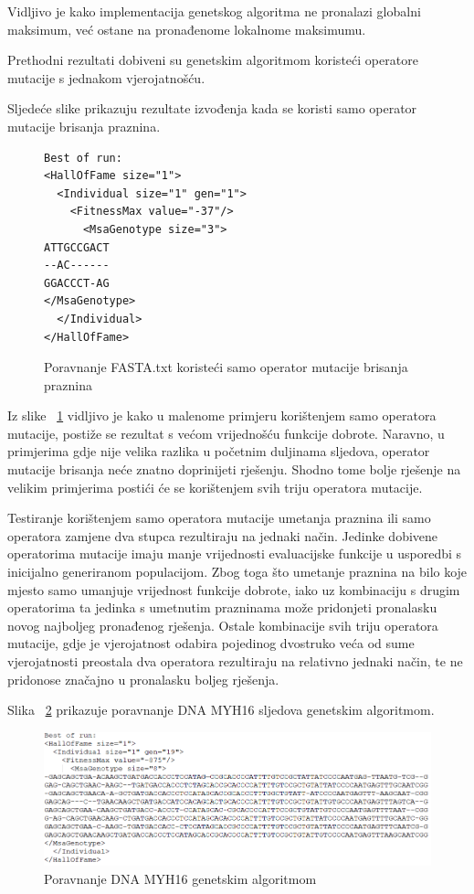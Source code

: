 \documentclass[times, utf8, zavrsni, numeric]{fer}
\begin{document}
Vidljivo je kako implementacija genetskog algoritma ne pronalazi globalni maksimum, već ostane na pronađenome lokalnome maksimumu.

Prethodni rezultati dobiveni su genetskim algoritmom koristeći operatore mutacije s jednakom vjerojatnošću.

Sljedeće slike prikazuju rezultate izvođenja kada se koristi samo operator mutacije brisanja praznina.



\begin{figure} [httb]
\begin{verbatim}
Best of run:
<HallOfFame size="1">
  <Individual size="1" gen="1">
    <FitnessMax value="-37"/>
      <MsaGenotype size="3">
ATTGCCGACT
--AC------
GGACCCT-AG
</MsaGenotype>
  </Individual>
</HallOfFame>
\end{verbatim}
\caption{Poravnanje FASTA.txt koristeći samo operator mutacije brisanja praznina}
\label{fig:samoDelete}
\end{figure}

Iz slike ~\ref{fig:samoDelete} vidljivo je kako u malenome primjeru korištenjem samo operatora mutacije, postiže se rezultat s većom vrijednošću funkcije dobrote. Naravno, u primjerima gdje nije velika razlika u početnim duljinama sljedova, operator mutacije brisanja neće znatno doprinijeti rješenju. Shodno tome bolje rješenje na velikim primjerima postići će se korištenjem svih triju operatora mutacije.

Testiranje korištenjem samo operatora mutacije umetanja praznina ili samo operatora zamjene dva stupca rezultiraju na jednaki način. Jedinke dobivene operatorima mutacije imaju manje vrijednosti evaluacijske funkcije u usporedbi s inicijalno generiranom populacijom. Zbog toga što umetanje praznina na bilo koje mjesto samo umanjuje vrijednost funkcije dobrote, iako uz kombinaciju s drugim operatorima ta jedinka s umetnutim prazninama može pridonjeti pronalasku novog najboljeg pronađenog rješenja. 
Ostale kombinacije svih triju operatora mutacije, gdje je vjerojatnost odabira pojedinog dvostruko veća od sume vjerojatnosti preostala dva operatora rezultiraju na relativno jednaki način, te ne pridonose značajno u pronalasku boljeg rješenja.

Slika ~\ref{fig:gamsaVeliki} prikazuje poravnanje DNA MYH16 sljedova genetskim algoritmom.


\begin{figure}[]
	\includegraphics[]{slike/gamsaVeliki2.PNG}
	\centering
	\caption{Poravnanje DNA MYH16 genetskim algoritmom}
	\label{fig:gamsaVeliki}
\end{figure}
\end{document}

